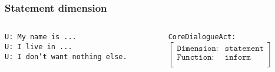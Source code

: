 \documentclass[11pt]{beamer}
\begin{document}
\begin{frame}[fragile]
\frametitle{Statement dimension}
	\begin{center}
	\end{center}
	\vspace{15pt}
	\begin{columns}
		\begin{column}{0.60\textwidth}
		{\color{teal} 
			\texttt{U: My name is ...}\\
			\vspace{10pt}
			\texttt{U: I live in ...}\\
			\vspace{10pt}
			\texttt{U: I don't want nothing else.}\\
		}
		\end{column}
		\begin{column}{0.40\textwidth}
			\footnotesize
			\texttt{CoreDialogueAct:} \\
				\vspace{10pt}
				$\begin{bmatrix}
						\texttt{Dimension:}    & \texttt{statement}\\ 
						\texttt{Function:}     & \texttt{inform}\\ 
				\end{bmatrix}$
		\end{column}
	\end{columns}
\end{frame}
\end{document}

